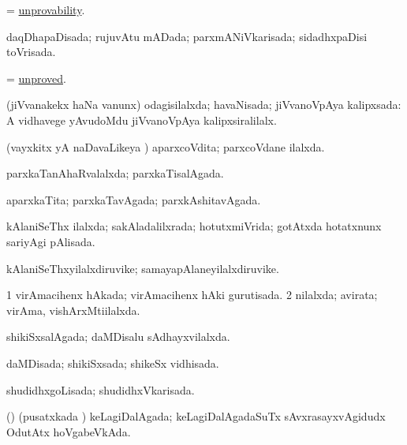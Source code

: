 \bentry
{} 
\gl{\nA}
\expl{}
\bmng
= \hyperlink{unprovability}{unprovability}. 
\emng
\eentry

\bentry
{} 
\gl{\gu}
\expl{}
\bmng
daqDhapaDisada; rujuvAtu mADada; parxmANiVkarisada; sidadhxpaDisi toVrisada. 
\emng
\eentry

\bentry
{} 
\gl{\gu}
\expl{}
\bmng
= \hyperlink{unproved}{unproved}. 
\emng
\eentry

\bentry
{} 
\gl{\gu}
\expl{}
\bmng
(jiVvanakekx haNa \mo vanunx) odagisilalxda; havaNisada; jiVvanoVpAya kalipxsada:  A vidhavege yAvudoMdu jiVvanoVpAya kalipxsiralilalx. 
\emng
\eentry

\bentry
{} 
\gl{\gu}
\expl{}
\bmng
(vayxkitx yA naDavaLikeya \vi) aparxcoVdita; parxcoVdane ilalxda. 
\emng
\eentry

\bentry
{} 
\gl{\gu}
\expl{}
\bmng
parxkaTanAhaRvalalxda; parxkaTisalAgada. 
\emng
\eentry

\bentry
{} 
\gl{\gu}
\expl{}
\bmng
aparxkaTita; parxkaTavAgada; parxkAshitavAgada. 
\emng
\eentry

\bentry
{} 
\gl{\gu}
\expl{}
\bmng
kAlaniSeThx ilalxda; sakAladalilxrada; hotutxmiVrida; gotAtxda hotatxnunx sariyAgi pAlisada. 
\emng
\eentry

\bentry
{} 
\gl{\nA}
\expl{}
\bmng
kAlaniSeThxyilalxdiruvike; samayapAlaneyilalxdiruvike. 
\emng
\eentry

\bentry
{} 
\gl{\gu}
\expl{}
\bmng
\bnum
\num{1} virAmacihenx hAkada; virAmacihenx hAki gurutisada. 
\num{2} nilalxda; avirata; virAma, vishArxMti{i}lalxda. 
\enum
\emng
\eentry

\bentry
{} 
\gl{\gu}
\expl{}
\bmng
shikiSxsalAgada; daMDisalu sAdhayxvilalxda. 
\emng
\eentry

\bentry
{} 
\gl{\gu}
\expl{}
\bmng
daMDisada; shikiSxsada; shikeSx vidhisada. 
\emng
\eentry

\bentry
{} 
\gl{\gu}
\expl{}
\bmng
shudidhxgoLisada; shudidhxVkarisada. 
\emng
\eentry

\bentry
{} 
\gl{\gu}
\expl{}
\bmng
(\AmA) (pusatxkada \vi) keLagiDalAgada; keLagiDalAgadaSuTx sAvxrasayxvAgidudx OdutAtx hoVgabeVkAda. 
\emng
\eentry

